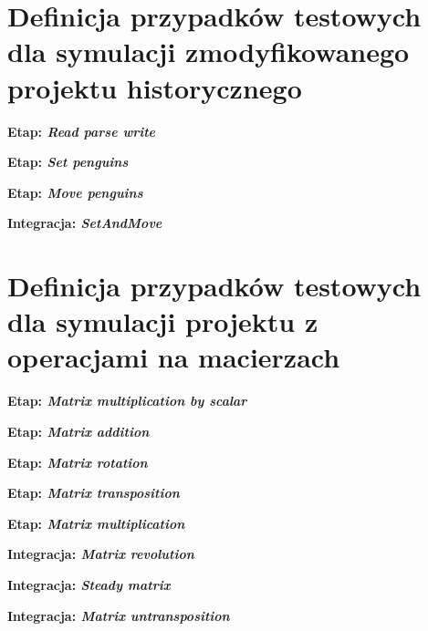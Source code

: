 \section*{Definicja przypadków testowych dla symulacji zmodyfikowanego projektu historycznego}
\label{file:test_cases_penguins}

{
\setlength\parindent{0pt}

\large
\textbf{Etap: \textit{Read parse write}}
\normalsize




\large
\textbf{Etap: \textit{Set penguins}}
\normalsize




\large
\textbf{Etap: \textit{Move penguins}}
\normalsize




\large
\textbf{Integracja: \textit{SetAndMove}}
\normalsize


}

\section*{Definicja przypadków testowych dla symulacji projektu z operacjami na macierzach}
\label{file:test_cases_matrix}

{
\setlength\parindent{0pt}

\large
\textbf{Etap: \textit{Matrix multiplication by scalar}}
\normalsize




\large
\textbf{Etap: \textit{Matrix addition}}
\normalsize




\large
\textbf{Etap: \textit{Matrix rotation}}
\normalsize




\large
\textbf{Etap: \textit{Matrix transposition}}
\normalsize




\large
\textbf{Etap: \textit{Matrix multiplication}}
\normalsize




\large
\textbf{Integracja: \textit{Matrix revolution}}
\normalsize




\large
\textbf{Integracja: \textit{Steady matrix}}
\normalsize




\large
\textbf{Integracja: \textit{Matrix untransposition}}
\normalsize


}

\clearpage
